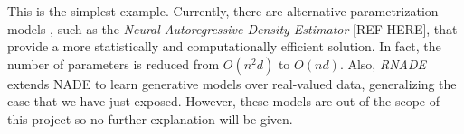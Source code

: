 
This is the simplest example. Currently, there are alternative parametrization models , such as the \emph{Neural Autoregressive Density Estimator} [REF HERE], that provide a more statistically and computationally efficient solution. In fact, the number of parameters is reduced from $O(n^2 d)$ to $O(nd)$. Also, \emph{RNADE} extends NADE to learn generative models over real-valued data, generalizing the case that we have just exposed. However, these models are out of the scope of this project so no further explanation will be given.

